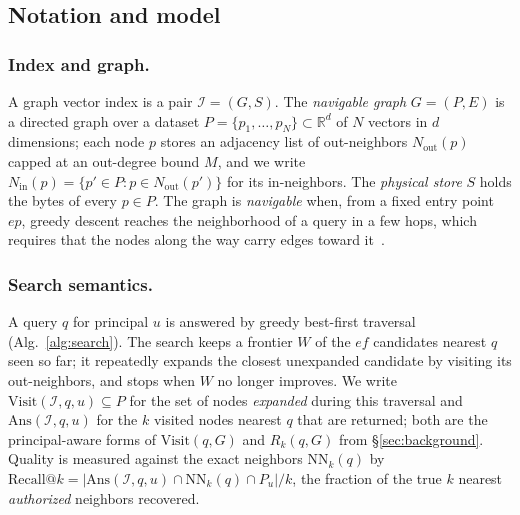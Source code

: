 \documentclass[sigconf, nonacm, review]{acmart}
\newcommand{\Nout}{N_{\mathrm{out}}}
\newcommand{\Nin}{N_{\mathrm{in}}}
\begin{document}
\subsection{Notation and model}
\label{app:model}

\subsubsection{Index and graph.}
A graph vector index is a pair $\mathcal{I}=(G,S)$. The \emph{navigable graph}
$G=(P,E)$ is a directed graph over a dataset
$P=\{p_1,\dots,p_N\}\subset\mathbb{R}^d$ of $N$ vectors in $d$ dimensions;
each node $p$ stores an adjacency list of out-neighbors $\Nout(p)$ capped at
an out-degree bound $M$, and we write $\Nin(p)=\{p'\in P: p\in\Nout(p')\}$ for
its in-neighbors. The \emph{physical store} $S$ holds the bytes of every
$p\in P$. The graph is \emph{navigable} when, from a fixed entry point
$\mathit{ep}$, greedy descent reaches the neighborhood of a query in a few
hops, which requires that the nodes along the way carry edges toward
it~\cite{DBLP:journals/pami/MalkovY20,DBLP:conf/nips/SubramanyaDSKK19}.

\subsubsection{Search semantics.}
\label{app:search-sem}
A query $q$ for principal $u$ is answered by greedy best-first traversal
(Alg.~\ref{alg:search}). The search keeps a frontier $W$ of the $\mathit{ef}$
candidates nearest $q$ seen so far; it repeatedly expands the closest
unexpanded candidate by visiting its out-neighbors, and stops when $W$ no
longer improves. We write $\mathrm{Visit}(\mathcal{I},q,u)\subseteq P$ for the
set of nodes \emph{expanded} during this traversal and
$\mathrm{Ans}(\mathcal{I},q,u)$ for the $k$ visited nodes nearest $q$ that are
returned; both are the principal-aware forms of $\mathrm{Visit}(q,G)$ and
$R_k(q,G)$ from \S\ref{sec:background}. Quality is measured against the exact
neighbors $\mathrm{NN}_k(q)$ by
$\mathrm{Recall}@k=|\mathrm{Ans}(\mathcal{I},q,u)\cap\mathrm{NN}_k(q)\cap
P_u|/k$, the fraction of the true $k$ nearest \emph{authorized} neighbors
recovered.
\end{document}
